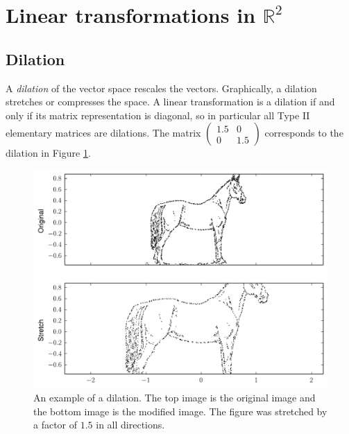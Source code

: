 \label{lab:ChangeBasis}

\section*{Linear transformations in $\mathbb{R}^2$}
\subsection*{Dilation}
A \emph{dilation} of the vector space rescales the vectors. Graphically, a dilation stretches or compresses the space. A linear transformation is a dilation if and only if its matrix representation is diagonal, so in particular all Type II elementary matrices are dilations. The matrix $\begin{pmatrix}
1.5 & 0\\
0 & 1.5 \end{pmatrix}$ corresponds to the dilation in Figure \ref{dilation_fig}.
\begin{figure}
\includegraphics[width=\textwidth]{stretch.pdf}
\caption{An example of a dilation. The top image is the original image and the bottom image is the modified image. The figure was stretched by a factor of $1.5$ in all directions.}
\label{dilation_fig}
\end{figure}

